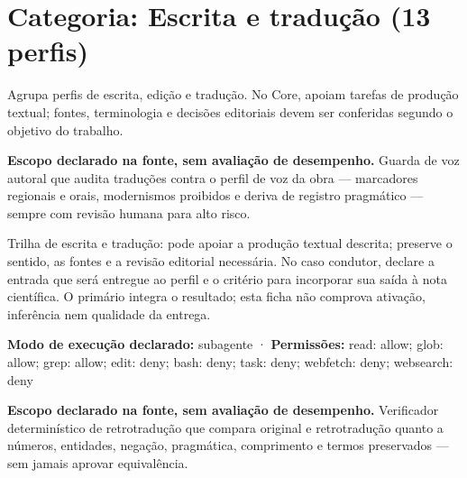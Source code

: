 \clearpage
\section{Categoria: Escrita e tradução (13 perfis)}

\begin{descricao}
Agrupa perfis de escrita, edição e tradução. No Core, apoiam tarefas de produção textual; fontes, terminologia e decisões editoriais devem ser conferidas segundo o objetivo do trabalho.
\end{descricao}


\begin{descricao}
\textbf{Escopo declarado na fonte, sem avaliação de desempenho.}
Guarda de voz autoral que audita traduções contra o perfil de voz da obra — marcadores regionais e orais, modernismos proibidos e deriva de registro pragmático — sempre com revisão humana para alto risco.
\end{descricao}

\begin{funcao}
Trilha de escrita e tradução: pode apoiar a produção textual descrita; preserve o sentido, as fontes e a revisão editorial necessária. No caso condutor, declare a entrada que será entregue ao perfil e o critério para incorporar sua saída à nota científica. O primário integra o resultado; esta ficha não comprova ativação, inferência nem qualidade da entrega.
\end{funcao}

\begin{arquitetura}
\textbf{Modo de execução declarado:} subagente · \textbf{Permissões:} read: allow; glob: allow; grep: allow; edit: deny; bash: deny; task: deny; webfetch: deny; websearch: deny
\end{arquitetura}


\begin{descricao}
\textbf{Escopo declarado na fonte, sem avaliação de desempenho.}
Verificador determinístico de retrotradução que compara original e retrotradução quanto a números, entidades, negação, pragmática, comprimento e termos preservados — sem jamais aprovar equivalência.
\end{descricao}

